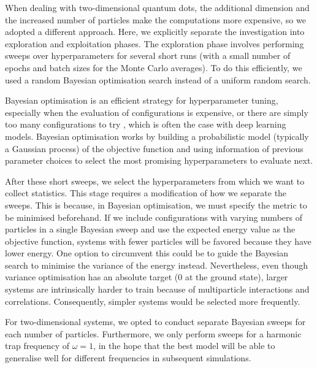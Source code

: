 When dealing with two-dimensional quantum dots, the additional dimension and the increased number of particles make the computations more expensive, so we adopted a different approach. Here, we explicitly separate the investigation into exploration and exploitation phases. The exploration phase involves performing sweeps over hyperparameters for several short runs (with a small number of epochs and batch sizes for the Monte Carlo averages). To do this efficiently, we used a random Bayesian optimisation search instead of a uniform random search. 

Bayesian optimisation is an efficient strategy for hyperparameter tuning, especially when the evaluation of configurations is expensive, or there are simply too many configurations to try \cite{dewancker2016bayesian}, which is often the case with deep learning models. Bayesian optimisation works by building a probabilistic model (typically a Gaussian process) of the objective function and using information of previous parameter choices to select the most promising hyperparameters to evaluate next.

After these short sweeps, we select the hyperparameters from which we want to collect statistics. This stage requires a modification of how we separate the sweeps. This is because, in Bayesian optimisation, we must specify the metric to be minimised beforehand. If we include configurations with varying numbers of particles in a single Bayesian sweep and use the expected energy value as the objective function, systems with fewer particles will be favored because they have lower energy. One option to circumvent this could be to guide the Bayesian search to minimise the variance of the energy instead. Nevertheless, even though variance optimisation has an absolute target (0 at the ground state), larger systems are intrinsically harder to train because of multiparticle interactions and correlations. Consequently, simpler systems would be selected more frequently.

For two-dimensional systems, we opted to conduct separate Bayesian sweeps for each number of particles. Furthermore, we only perform sweeps for a harmonic trap frequency of $\omega = 1$, in the hope that the best model will be able to generalise well for different frequencies in subsequent simulations.


